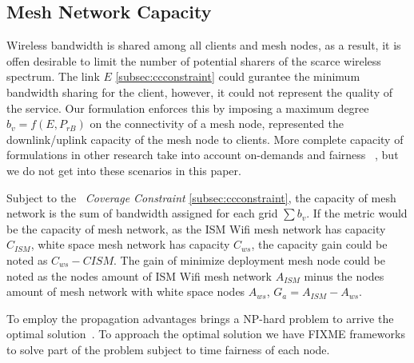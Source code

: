 \subsection{Mesh Network Capacity}
Wireless bandwidth is shared among all clients and mesh nodes, as a result, it is offen desirable to limit the number of potential sharers of the scarce wireless spectrum. 
The link $E$ \ref{subsec:ccconstraint} could gurantee the minimum bandwidth sharing for the client, however, it could not represent the quality of the service. Our formulation enforces this by imposing a maximum degree $b_v=f(E,P_{rB})$ on the connectivity of a mesh node, represented the downlink/uplink capacity of the mesh node to clients. More complete capacity of formulations in other research take into account on-demands and fairness ~\cite{arkoulis2013optimal}, but we do not get into these scenarios in this paper.


Subject to the ~\emph{Coverage Constraint} \ref{subsec:ccconstraint}, the capacity of mesh network is the sum of bandwidth assigned for each grid $\sum{b_v}$. If the metric would be the capacity of mesh network, as the ISM Wifi mesh network has capacity $C_{ISM}$, white space mesh network has capacity $C_{ws}$, the capacity gain could be noted as $C_{ws}-C{ISM}$.
The gain of minimize deployment mesh node could be noted as the nodes amount of ISM Wifi mesh network $A_{ISM}$ minus the nodes amount of mesh network with white space nodes $A_{ws}$, $G_a=A_{ISM}-A_{ws}$.


To employ the propagation advantages brings a NP-hard problem to arrive the optimal solution~\cite{arkoulis2013optimal}. 
To approach the optimal solution we have FIXME frameworks to solve part of the problem subject to time fairness of each node.





